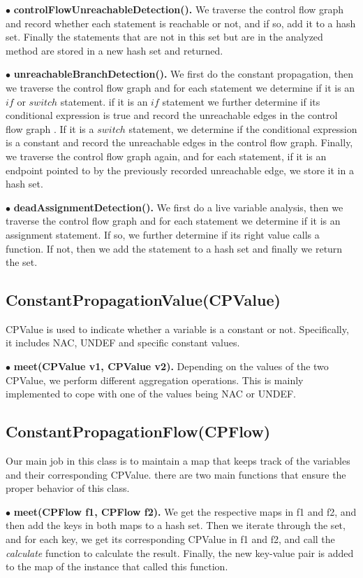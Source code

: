 \documentclass[conference]{IEEEtran}
\begin{document}
\noindent $\bullet$ \textbf{controlFlowUnreachableDetection(). } We traverse the control flow graph and record whether each statement is reachable or not, and if so, add it to a hash set. Finally the statements that are not in this set but are in the analyzed method are stored in a new hash set and returned.

\noindent $\bullet$ \textbf{unreachableBranchDetection(). } We first do the constant propagation, then we traverse the control flow graph and for each statement we determine if it is an $if$ or $switch$ statement. if it is an $if$ statement we further determine if its conditional expression is true and record the unreachable edges in the control flow graph . If it is a $switch$ statement, we determine if the conditional expression is a constant and record the unreachable edges in the control flow graph. Finally, we traverse the control flow graph again, and for each statement, if it is an endpoint pointed to by the previously recorded unreachable edge, we store it in a hash set. 

\noindent $\bullet$ \textbf{deadAssignmentDetection(). } We first do a live variable analysis, then we traverse the control flow graph and for each statement we determine if it is an assignment statement. If so, we further determine if its right value calls a function. If not, then we add the statement to a hash set and finally we return the set.

\subsection{ConstantPropagationValue(CPValue)}
CPValue is used to indicate whether a variable is a constant or not. Specifically, it includes NAC, UNDEF and specific constant values.

\noindent $\bullet$ \textbf{meet(CPValue v1, CPValue v2). } Depending on the values of the two CPValue, we perform different aggregation operations. This is mainly implemented to cope with one of the values being NAC or UNDEF.

\subsection{ConstantPropagationFlow(CPFlow)}
Our main job in this class is to maintain a map that keeps track of the variables and their corresponding CPValue. there are two main functions that ensure the proper behavior of this class.

\noindent $\bullet$ \textbf{meet(CPFlow f1, CPFlow f2). } We get the respective maps in f1 and f2, and then add the keys in both maps to a hash set. Then we iterate through the set, and for each key, we get its corresponding CPValue in f1 and f2, and call the \textit{calculate} function to calculate the result. Finally, the new key-value pair is added to the map of the instance that called this function.
\end{document}
